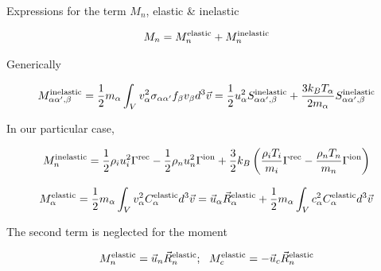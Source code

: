 \documentclass{beamer}
\begin{document}
\begin{frame}{Expressions for the term $M_n$, elastic \& inelastic }

\begin{equation} \nonumber
M_n= M_n^{\rm elastic} + M_n^{\rm inelastic}
\end{equation}

Generically

\begin{equation} \nonumber
M_{\alpha\alpha',\beta}^{\rm inelastic} = \frac{1}{2} m_\alpha \int_V{v_\alpha^2 \sigma_{\alpha \alpha'} f_{\beta} v_{\beta} d^3\vec{v} } = 
\frac{1}{2} u_\alpha^2 S_{\alpha\alpha',\beta}^{\rm inelastic} + \frac{3 k_B T_\alpha}{2 m_\alpha} S_{\alpha\alpha',\beta}^{\rm inelastic} 
\end{equation}

In our particular case,

\begin{equation} \nonumber
M_n^{\rm inelastic} = \frac{1}{2} \rho_i u_i^2 \Gamma^{\rm rec} - \frac{1}{2}\rho_n u_n^2 \Gamma^{\rm ion} + \frac{3}{2} k_B\left ( \frac{\rho_i T_i}{m_i} \Gamma^{\rm rec} - \frac{\rho_n T_n}{m_n} \Gamma^{\rm ion} \right)
\end{equation} 

\begin{equation} \nonumber
M_\alpha^{\rm elastic} = \frac{1}{2} m_\alpha \int_V{v_\alpha^2 C_\alpha^{\rm elastic} d^3\vec{v} } = \vec{u}_\alpha \vec{R}_\alpha^{\rm elastic} + \frac{1}{2} m_\alpha \int_V{c_\alpha^2 C_\alpha^{\rm elastic} d^3\vec{v} } 
\end{equation} 

The second term is neglected for the moment

\begin{equation}  \nonumber
M_n^{\rm elastic} = \vec{u}_n \vec{R}_n^{\rm elastic} ; \,\,\,\,M_c^{\rm elastic} = -\vec{u}_c \vec{R}_n^{\rm elastic}
\end{equation}

\end{frame}
\end{document}
